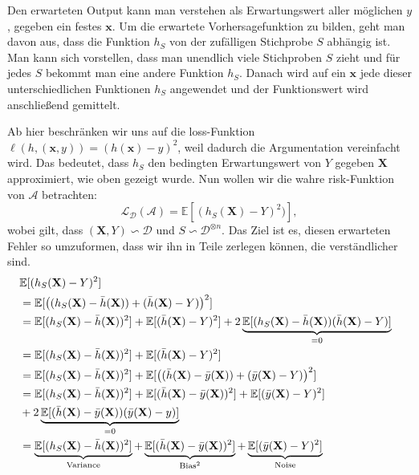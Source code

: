 Den erwarteten Output kann man verstehen als Erwartungswert aller m\"oglichen $y$, gegeben ein festes $\mathbf{x}$.
Um die erwartete Vorhersagefunktion zu bilden, geht man davon aus, dass
die Funktion $h_S$ von der zuf\"alligen Stichprobe $S$ abh\"angig ist. Man kann sich vorstellen, dass man unendlich viele Stichproben $S$ zieht und
f\"ur jedes $S$ bekommt man eine andere Funktion $h_S$. Danach wird auf ein $\mathbf{x}$ jede dieser unterschiedlichen Funktionen $h_S$ angewendet und
der Funktionswert wird anschlie{\ss}end gemittelt.

Ab hier beschr\"anken wir uns auf die loss-Funktion $ \ell(h, (\mathbf{x},y)) = (h(\mathbf{x}) - y)^2 $, weil dadurch die Argumentation vereinfacht wird.
Das bedeutet, dass $h_S$ den bedingten Erwartungswert von
$Y$ gegeben $\mathbf{X}$ approximiert, wie oben gezeigt wurde. Nun wollen wir die wahre risk-Funktion von $\mathcal{A}$ betrachten:
$$ \mathcal{L}_{\mathcal{D}}(\mathcal{A}) = \mathbb{E}[(h_S(\mathbf{\mathbf{X}})-Y)^2)],$$
wobei gilt, dass $(\mathbf{X}, Y) \backsim \mathcal{D}$ und $S \backsim \mathcal{D}^{\otimes n}$.
Das Ziel ist es, diesen erwarteten Fehler so umzuformen, dass wir ihn in Teile zerlegen k\"onnen, die verst\"andlicher sind.
\begin{equation*}
	\begin{split}
		\lefteqn{ \mathbb{E}[(h_S(\mathbf{X})-Y)^2] } \\\
		& = \mathbb{E}[\bigl((h_S(\mathbf{X})-\bar{h}(\mathbf{X}))+(\bar{h}(\mathbf{X})-Y)\bigr)^2] \\\
		& = \mathbb{E}[(h_S(\mathbf{X})- \bar{h}(\mathbf{X}))^2] + \mathbb{E}[(\bar{h}(\mathbf{X})-Y)^2] + 2\underbrace{\mathbb{E}[(h_S(\mathbf{X})-\bar{h}(\mathbf{X}))(\bar{h}(\mathbf{X})-Y)]}_{=0} \\\
		& = \mathbb{E}[(h_S(\mathbf{X})- \bar{h}(\mathbf{X}))^2] + \mathbb{E}[(\bar{h}(\mathbf{X})-Y)^2] \\\
		& = \mathbb{E}[(h_S(\mathbf{X})- \bar{h}(\mathbf{X}))^2] + \mathbb{E}[\bigl( (\bar{h}(\mathbf{X})-\bar{y}(\mathbf{X}))+(\bar{y}(\mathbf{X})-Y)\bigr)^2 ] \\\
		& = \mathbb{E}[(h_S(\mathbf{X})- \bar{h}(\mathbf{X}))^2] + \mathbb{E}[(\bar{h}(\mathbf{X})-\bar{y}(\mathbf{X}))^2] +\mathbb{E}[(\bar{y}(\mathbf{X})-Y)^2] \\\
		&+ 2\underbrace{\mathbb{E}[(\bar{h}(\mathbf{X})-\bar{y}(\mathbf{X}))(\bar{y}(\mathbf{X})-y)]}_{=0} \\\
		& = \underbrace{\mathbb{E}[(h_S(\mathbf{X})- \bar{h}(\mathbf{X}))^2]}_{\text{Variance}}+\underbrace{\mathbb{E}[(\bar{h}(\mathbf{X})-\bar{y}(\mathbf{X}))^2]}_{\text{Bias}^2} + \underbrace{\mathbb{E}[(\bar{y}(\mathbf{X})-Y)^2]}_{\text{Noise}}
	\end{split}
\end{equation*}
